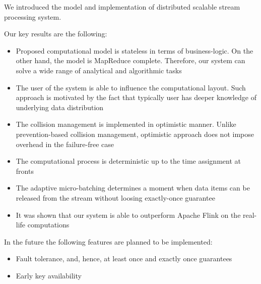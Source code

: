 
\label {fs-conclusions}

We introduced the model and implementation of distributed scalable stream processing system. 

Our key results are the following:

\begin{itemize}
    \item Proposed computational model is stateless in terms of business-logic. On the other hand, the model is MapReduce complete. Therefore, our system can solve a wide range of analytical and algorithmic tasks
    \item The user of the system is able to influence the computational layout. Such approach is motivated by the fact that typically user has deeper knowledge of underlying data distribution
    \item The collision management is implemented in optimistic manner. Unlike prevention-based collision management, optimistic approach does not impose overhead in the failure-free case
    \item The computational process is deterministic up to the time assignment at fronts
    \item The adaptive micro-batching determines a moment when data items can be released from the stream without loosing exactly-once guarantee  
    \item It was shown that our system is able to outperform Apache Flink on the real-life computations
\end{itemize}

In the future the following features are planned to be implemented:
\begin{itemize}
    \item Fault tolerance, and, hence, at least once and exactly once guarantees
    \item Early key availability
\end{itemize}
